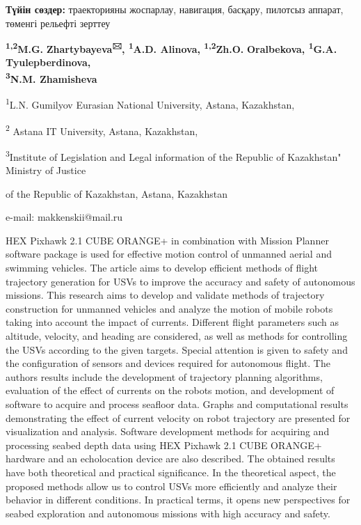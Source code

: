 {\bfseries Түйін сөздер:} траекторияны жоспарлау, навигация, басқару,
пилотсыз аппарат, төменгі рельефті зерттеу


\begin{center}
{\bfseries \textsuperscript{1,2}M.G.}
{\bfseries Zhartybayeva\textsuperscript{🖂}, \textsuperscript{1}A.D.
Alinova, \textsuperscript{1,2}Zh.O.} {\bfseries Oralbekova,
\textsuperscript{1}G.A.} {\bfseries Tyulepberdinova,\\
\textsuperscript{3}N.M. Zhamisheva}

\textsuperscript{1}L.N. Gumilyov Eurasian National University, Astana,
Kazakhstan,

\textsuperscript{2} Astana IT University, Astana, Kazakhstan,

\textsuperscript{3}Institute of Legislation and Legal information of the
Republic of Kazakhstan" Ministry of Justice

of the Republic of Kazakhstan, Astana, Kazakhstan

e-mail: makkenskii@mail.ru
\end{center}

HEX Pixhawk 2.1 CUBE ORANGE+ in combination with Mission Planner
software package is used for effective motion control of unmanned aerial
and swimming vehicles. The article aims to develop efficient methods of
flight trajectory generation for USVs to improve the accuracy and safety
of autonomous missions. This research aims to develop and validate
methods of trajectory construction for unmanned vehicles and analyze the
motion of mobile robots taking into account the impact of currents.
Different flight parameters such as altitude, velocity, and heading are
considered, as well as methods for controlling the USVs according to the
given targets. Special attention is given to safety and the
configuration of sensors and devices required for autonomous flight. The
author\textquotesingle s results include the development of trajectory
planning algorithms, evaluation of the effect of currents on the
robot\textquotesingle s motion, and development of software to acquire
and process seafloor data. Graphs and computational results
demonstrating the effect of current velocity on robot trajectory are
presented for visualization and analysis. Software development methods
for acquiring and processing seabed depth data using HEX Pixhawk 2.1
CUBE ORANGE+ hardware and an echolocation device are also described. The
obtained results have both theoretical and practical significance. In
the theoretical aspect, the proposed methods allow us to control USVs
more efficiently and analyze their behavior in different conditions. In
practical terms, it opens new perspectives for seabed exploration and
autonomous missions with high accuracy and safety.

